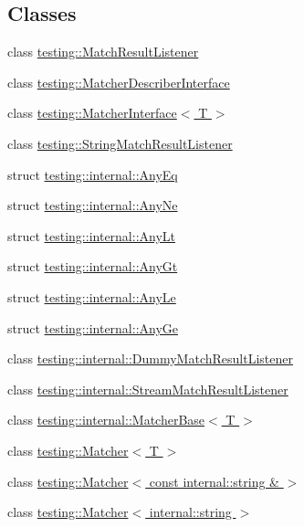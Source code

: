 \subsection*{Classes}
\begin{DoxyCompactItemize}
\item 
class \hyperlink{classtesting_1_1MatchResultListener}{testing\+::\+Match\+Result\+Listener}
\item 
class \hyperlink{classtesting_1_1MatcherDescriberInterface}{testing\+::\+Matcher\+Describer\+Interface}
\item 
class \hyperlink{classtesting_1_1MatcherInterface}{testing\+::\+Matcher\+Interface$<$ T $>$}
\item 
class \hyperlink{classtesting_1_1StringMatchResultListener}{testing\+::\+String\+Match\+Result\+Listener}
\item 
struct \hyperlink{structtesting_1_1internal_1_1AnyEq}{testing\+::internal\+::\+Any\+Eq}
\item 
struct \hyperlink{structtesting_1_1internal_1_1AnyNe}{testing\+::internal\+::\+Any\+Ne}
\item 
struct \hyperlink{structtesting_1_1internal_1_1AnyLt}{testing\+::internal\+::\+Any\+Lt}
\item 
struct \hyperlink{structtesting_1_1internal_1_1AnyGt}{testing\+::internal\+::\+Any\+Gt}
\item 
struct \hyperlink{structtesting_1_1internal_1_1AnyLe}{testing\+::internal\+::\+Any\+Le}
\item 
struct \hyperlink{structtesting_1_1internal_1_1AnyGe}{testing\+::internal\+::\+Any\+Ge}
\item 
class \hyperlink{classtesting_1_1internal_1_1DummyMatchResultListener}{testing\+::internal\+::\+Dummy\+Match\+Result\+Listener}
\item 
class \hyperlink{classtesting_1_1internal_1_1StreamMatchResultListener}{testing\+::internal\+::\+Stream\+Match\+Result\+Listener}
\item 
class \hyperlink{classtesting_1_1internal_1_1MatcherBase}{testing\+::internal\+::\+Matcher\+Base$<$ T $>$}
\item 
class \hyperlink{classtesting_1_1Matcher}{testing\+::\+Matcher$<$ T $>$}
\item 
class \hyperlink{classtesting_1_1Matcher_3_01const_01internal_1_1string_01_6_01_4}{testing\+::\+Matcher$<$ const internal\+::string \& $>$}
\item 
class \hyperlink{classtesting_1_1Matcher_3_01internal_1_1string_01_4}{testing\+::\+Matcher$<$ internal\+::string $>$}

\end{DoxyCompactItemize}
